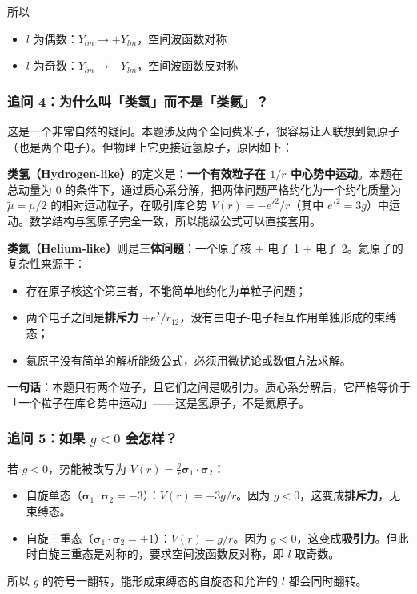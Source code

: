 所以
\begin{itemize}[nosep]
    \item $l$ 为偶数：$Y_{lm} \to +Y_{lm}$，空间波函数对称
    \item $l$ 为奇数：$Y_{lm} \to -Y_{lm}$，空间波函数反对称
\end{itemize}

\subsubsection*{追问 4：为什么叫「类氢」而不是「类氦」？}

这是一个非常自然的疑问。本题涉及两个全同费米子，很容易让人联想到氦原子（也是两个电子）。但物理上它更接近氢原子，原因如下：

\textbf{类氢（Hydrogen-like）}的定义是：\textbf{一个有效粒子在 $1/r$ 中心势中运动}。本题在总动量为 $0$ 的条件下，通过质心系分解，把两体问题严格约化为一个约化质量为 $\tilde{\mu}=\mu/2$ 的相对运动粒子，在吸引库仑势 $V(r) = -e'^2/r$（其中 $e'^2=3g$）中运动。数学结构与氢原子完全一致，所以能级公式可以直接套用。

\textbf{类氦（Helium-like）}则是\textbf{三体问题}：一个原子核 + 电子 1 + 电子 2。氦原子的复杂性来源于：
\begin{itemize}[nosep]
    \item 存在原子核这个第三者，不能简单地约化为单粒子问题；
    \item 两个电子之间是\textbf{排斥力} $+e^2/r_{12}$，没有由电子-电子相互作用单独形成的束缚态；
    \item 氦原子没有简单的解析能级公式，必须用微扰论或数值方法求解。
\end{itemize}

\textbf{一句话}：本题只有两个粒子，且它们之间是吸引力。质心系分解后，它严格等价于「一个粒子在库仑势中运动」——这是氢原子，不是氦原子。

\subsubsection*{追问 5：如果 $g < 0$ 会怎样？}

若 $g < 0$，势能被改写为 $V(r) = \frac{g}{r} \bm{\sigma}_1 \cdot \bm{\sigma}_2$：
\begin{itemize}[nosep]
    \item 自旋单态（$\bm{\sigma}_1 \cdot \bm{\sigma}_2 = -3$）：$V(r) = -3g/r$。因为 $g<0$，这变成\textbf{排斥力}，无束缚态。
    \item 自旋三重态（$\bm{\sigma}_1 \cdot \bm{\sigma}_2 = +1$）：$V(r) = g/r$。因为 $g<0$，这变成\textbf{吸引力}。但此时自旋三重态是对称的，要求空间波函数反对称，即 $l$ 取奇数。
\end{itemize}
所以 $g$ 的符号一翻转，能形成束缚态的自旋态和允许的 $l$ 都会同时翻转。

